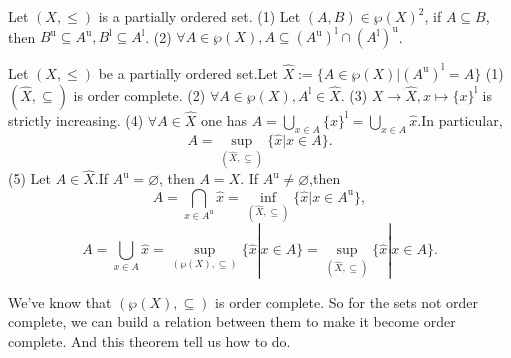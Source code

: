 \documentclass{book}
\numberwithin{equation}{section}
\begin{document}
\begin{lemmaenv}
    Let $(X,\le)$ is a partially ordered set.
    \newline
    (1) Let $(A,B)\in \wp(X)^2$, if $A\subseteq B$, then $B^\mathrm{u}\subseteq A^\mathrm{u},B^\mathrm{l}\subseteq A^\mathrm{l}$.
    \newline
    (2) $\forall A\in \wp(X),A\subseteq (A^\mathrm{u})^\mathrm{l}\cap (A^\mathrm{l})^\mathrm{u}$.
\end{lemmaenv}

\begin{theoremenv}
    \quad
    \newline
    Let $(X,\le )$ be a partially ordered set.Let $\hat{X}:=\{A\in \wp (X)|(A^\mathrm{u})^\mathrm{l}=A\}$
\newline
(1) $(\hat{X},\subseteq)$ is order complete.
\newline
(2) $\forall A\in \wp(X),A^\mathrm{l}\in \hat{X}$.
\newline
(3) $X\rightarrow \hat{X},x\mapsto \{x\}^\mathrm{l}$ is strictly increasing.
\newline
(4) $\forall A\in \hat{X}$ one has $A=\bigcup_{x\in A}\{x\}^\mathrm{l}=\bigcup_{x\in A}\hat{x}$.In particular, 
$$A=\sup_{(\hat{X},\subseteq)}\{\hat{x}|x\in A\}.$$
(5) Let $A\in \hat{X}$.If $A^\mathrm{u}=\varnothing$, then $A=X$. If $A^\mathrm{u}\not=\varnothing$,then 
$$A=\bigcap_{x\in A^\mathrm{u}}\hat{x}=\inf_{(\hat{X},\subseteq)}\{\hat{x}|x\in A^\mathrm{u}\},$$
$$A=\bigcup_{x\in A}\hat{x}=\sup_{(\wp(X),\subseteq)}\{\hat{x}|x\in A\}=\sup_{(\hat{X},\subseteq)}\{\hat{x}|x\in A\}.$$
\end{theoremenv}
\begin{remark}
    We've know that $(\wp(X),\subseteq)$ is order complete. So for the sets not order complete, we can build a relation between them to make it become order complete. And this theorem tell us how to do.
\end{remark}
\end{document}
